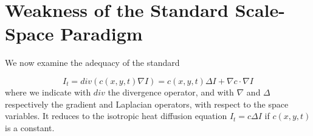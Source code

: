 \documentclass[10pt,letterpaper]{article}
\begin{document}
	\section{Weakness of the Standard Scale-Space Paradigm}
	We now examine the adequacy of the standard
	
	\begin{equation}
	I_t=div(c(x,y,t) \nabla I) = c(x,y,t)\Delta I + \nabla c \cdot \nabla I
	\end{equation}
	where we indicate with $div$ the divergence operator, and with $\nabla$ and $\Delta$ respectively the gradient and Laplacian operators, with respect to the space variables. It reduces to the isotropic heat diffusion equation $I_t = c\Delta I$ if $c(x,y,t)$ is a constant.
	
	
	
	
\end{document}
